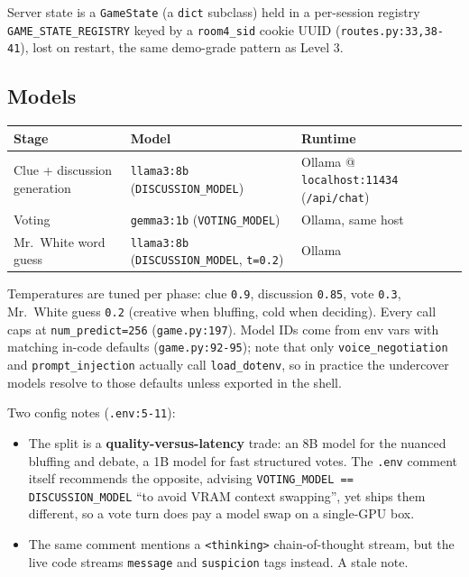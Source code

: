 \documentclass[11pt,a4paper]{article}
\begin{document}
\noindent Server state is a \texttt{GameState} (a \texttt{dict} subclass) held in
a per-session registry \texttt{GAME\_STATE\_REGISTRY} keyed by a \texttt{room4\_sid}
cookie UUID (\texttt{routes.py:33,38-41}), lost on restart, the same demo-grade
pattern as Level 3.

\subsection{Models}
\begin{table}[H]
\centering
\small
\renewcommand{\arraystretch}{1.25}
\begin{tabularx}{\linewidth}{l X X}
\toprule
\textbf{Stage} & \textbf{Model} & \textbf{Runtime} \\
\midrule
Clue + discussion generation & \texttt{llama3:8b} (\texttt{DISCUSSION\_MODEL}) & Ollama @ \texttt{localhost:11434} (\texttt{/api/chat}) \\
Voting & \texttt{gemma3:1b} (\texttt{VOTING\_MODEL}) & Ollama, same host \\
Mr.\ White word guess & \texttt{llama3:8b} (\texttt{DISCUSSION\_MODEL}, \texttt{t=0.2}) & Ollama \\
\bottomrule
\end{tabularx}
\end{table}

\noindent Temperatures are tuned per phase: clue \texttt{0.9}, discussion
\texttt{0.85}, vote \texttt{0.3}, Mr.\ White guess \texttt{0.2} (creative when
bluffing, cold when deciding). Every call caps at \texttt{num\_predict=256}
(\texttt{game.py:197}). Model IDs come from env vars with matching in-code
defaults (\texttt{game.py:92-95}); note that only \texttt{voice\_negotiation} and
\texttt{prompt\_injection} actually call \texttt{load\_dotenv}, so in practice the
undercover models resolve to those defaults unless exported in the shell.

\noindent Two config notes (\texttt{.env:5-11}):
\begin{itemize}[leftmargin=*,itemsep=2pt]
    \item The split is a \textbf{quality-versus-latency} trade: an 8B model for
    the nuanced bluffing and debate, a 1B model for fast structured votes. The
    \texttt{.env} comment itself recommends the opposite, advising
    \texttt{VOTING\_MODEL == DISCUSSION\_MODEL} ``to avoid VRAM context
    swapping'', yet ships them different, so a vote turn does pay a model swap on
    a single-GPU box.
    \item The same comment mentions a \texttt{<thinking>} chain-of-thought stream,
    but the live code streams \texttt{message} and \texttt{suspicion} tags
    instead. A stale note.
\end{itemize}
\end{document}
